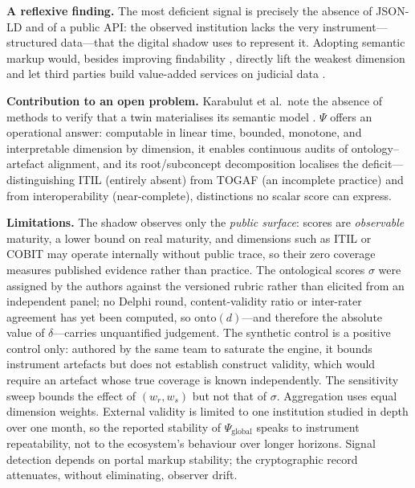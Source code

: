 \documentclass[engproc,proceedingpaper,submit,moreauthors]{Definitions/mdpi}
\begin{document}
\textbf{A reflexive finding.} The most deficient signal is precisely the absence of JSON-LD and of a public API: the observed institution lacks the very instrument---structured data---that the digital shadow uses to represent it. Adopting semantic markup would, besides improving findability \cite{Guha2016}, directly lift the weakest dimension and let third parties build value-added services on judicial data \cite{Attard2015,Wilkinson2016}.

\textbf{Contribution to an open problem.} Karabulut et al.\ note the absence of methods to verify that a twin materialises its semantic model \cite{Karabulut2024}. $\Psi$ offers an operational answer: computable in linear time, bounded, monotone, and interpretable dimension by dimension, it enables continuous audits of ontology--artefact alignment, and its root/subconcept decomposition localises the deficit---distinguishing ITIL (entirely absent) from TOGAF (an incomplete practice) and from interoperability (near-complete), distinctions no scalar score can express.

\textbf{Limitations.} The shadow observes only the \emph{public surface}: scores are \emph{observable} maturity, a lower bound on real maturity, and dimensions such as ITIL or COBIT may operate internally without public trace, so their zero coverage measures published evidence rather than practice. The ontological scores $\sigma$ were assigned by the authors against the versioned rubric rather than elicited from an independent panel; no Delphi round, content-validity ratio \cite{Lawshe1975} or inter-rater agreement has yet been computed, so $\mathrm{onto}(d)$---and therefore the absolute value of $\delta$---carries unquantified judgement. The synthetic control is a positive control only: authored by the same team to saturate the engine, it bounds instrument artefacts but does not establish construct validity, which would require an artefact whose true coverage is known independently. The sensitivity sweep bounds the effect of $(w_r,w_s)$ but not that of $\sigma$. Aggregation uses equal dimension weights. External validity is limited to one institution studied in depth over one month, so the reported stability of $\Psi_{\mathrm{global}}$ speaks to instrument repeatability, not to the ecosystem's behaviour over longer horizons. Signal detection depends on portal markup stability; the cryptographic record attenuates, without eliminating, observer drift.
\end{document}
